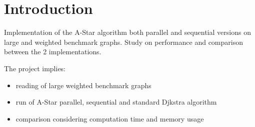 \section{Introduction}
\label{Sec:intro}

Implementation of the A-Star algorithm both parallel and sequential versions on large and weighted benchmark graphs.
Study on performance and comparison between the 2 implementations.

The project implies:
\begin{itemize}
    \item reading of large weighted benchmark graphs
    \item run of A-Star parallel, sequential and standard Djkstra algorithm
    \item comparison considering computation time and memory usage
\end{itemize}